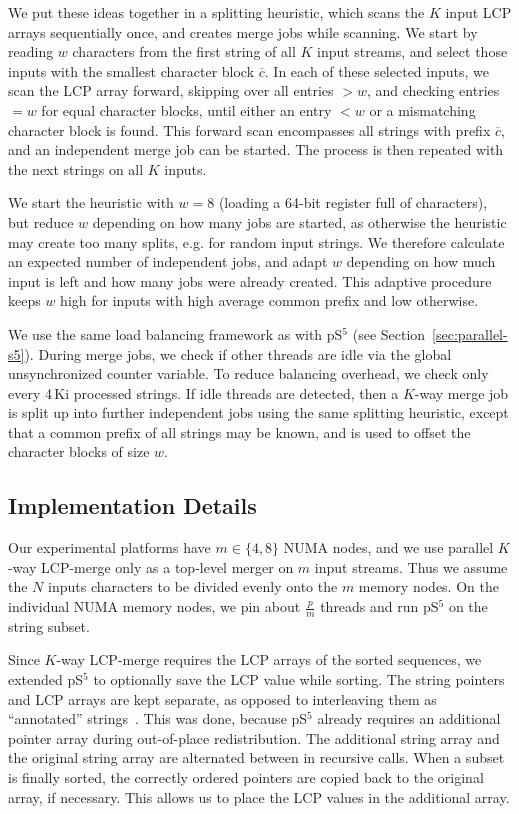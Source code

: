 \documentclass[a4paper]{myjournal}
\begin{document}
We put these ideas together in a splitting heuristic, which scans the $K$ input
LCP arrays sequentially once, and creates merge jobs while scanning.  We start
by reading $w$ characters from the first string of all $K$ input streams, and
select those inputs with the smallest character block $\overline{c}$. In each of
these selected inputs, we scan the LCP array forward, skipping over all entries
$> w$, and checking entries $= w$ for equal character blocks, until either an
entry $< w$ or a mismatching character block is found. This forward scan
encompasses all strings with prefix $\overline{c}$, and an independent merge job
can be started.  The process is then repeated with the next strings on all $K$
inputs.

We start the heuristic with $w = 8$ (loading a 64-bit register full of
characters), but reduce $w$ depending on how many jobs are started, as otherwise
the heuristic may create too many splits, e.g. for random input strings. We
therefore calculate an expected number of independent jobs, and adapt $w$
depending on how much input is left and how many jobs were already created. This
adaptive procedure keeps $w$ high for inputs with high average common prefix and
low otherwise.

We use the same load balancing framework as with pS$^5$ (see
Section~\ref{sec:parallel-s5}).  During merge jobs, we check if other threads
are idle via the global unsynchronized counter variable. To reduce balancing
overhead, we check only every 4\,Ki processed strings. If idle threads are
detected, then a $K$-way merge job is split up into further independent jobs
using the same splitting heuristic, except that a common prefix of all strings
may be known, and is used to offset the character blocks of size $w$.

\subsection{Implementation Details}\label{sec:merge-details}

Our experimental platforms have $m \in \{ 4, 8 \}$ NUMA nodes, and we use
parallel $K$-way LCP-merge only as a top-level merger on $m$ input
streams. Thus we assume the $N$ inputs characters to be divided evenly onto the
$m$ memory nodes.  On the individual NUMA memory nodes, we pin about
$\frac{p}{m}$ threads and run pS$^5$ on the string subset.

Since $K$-way LCP-merge requires the LCP arrays of the sorted sequences, we
extended pS$^5$ to optionally save the LCP value while sorting. The string
pointers and LCP arrays are kept separate, as opposed to interleaving them as
``annotated'' strings~\cite{ng2008merging}. This was done, because pS$^5$
already requires an additional pointer array during out-of-place
redistribution. The additional string array and the original string array are
alternated between in recursive calls. When a subset is finally sorted, the
correctly ordered pointers are copied back to the original array, if
necessary. This allows us to place the LCP values in the additional array.
\end{document}
